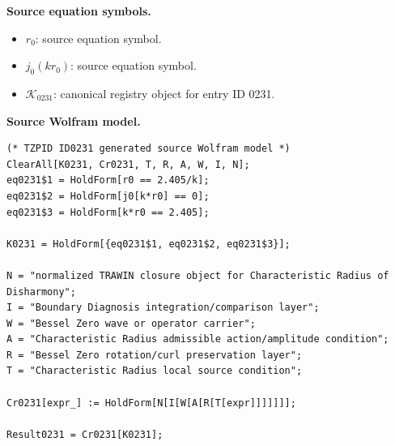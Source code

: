 \begin{minipage}[t]{0.49\linewidth}
\begingroup
\small
\raggedright
\textbf{Source equation symbols.}\par
\begin{itemize}[leftmargin=1.35em,itemsep=1pt,topsep=1pt,parsep=0pt]
    \item $r_0$: source equation symbol.
    \item $j_0(kr_0)$: source equation symbol.
    \item $\mathcal{K}_{0231}$: canonical registry object for entry ID 0231.
\end{itemize}
\endgroup
\end{minipage}\hfill
\begin{minipage}[t]{0.47\linewidth}
\begingroup
\scriptsize
\raggedright
\textbf{Source Wolfram model.}\par
\begin{Verbatim}[fontsize=\tiny,breaklines=true,breakanywhere=true]
(* TZPID ID0231 generated source Wolfram model *)
ClearAll[K0231, Cr0231, T, R, A, W, I, N];
eq0231$1 = HoldForm[r0 == 2.405/k];
eq0231$2 = HoldForm[j0[k*r0] == 0];
eq0231$3 = HoldForm[k*r0 == 2.405];

K0231 = HoldForm[{eq0231$1, eq0231$2, eq0231$3}];

N = "normalized TRAWIN closure object for Characteristic Radius of Disharmony";
I = "Boundary Diagnosis integration/comparison layer";
W = "Bessel Zero wave or operator carrier";
A = "Characteristic Radius admissible action/amplitude condition";
R = "Bessel Zero rotation/curl preservation layer";
T = "Characteristic Radius local source condition";

Cr0231[expr_] := HoldForm[N[I[W[A[R[T[expr]]]]]]];

Result0231 = Cr0231[K0231];
\end{Verbatim}
\endgroup
\end{minipage}

